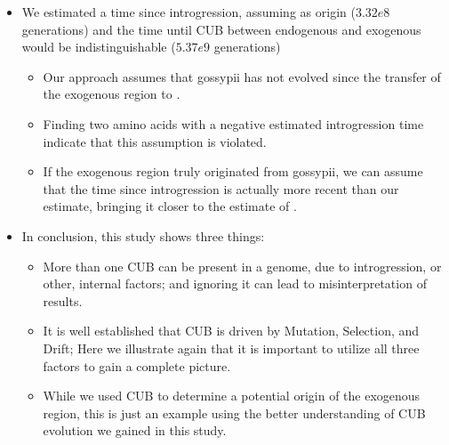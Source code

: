 \documentclass[12pt]{article}
\begin{document}
\begin{itemize}
	\item We estimated a time since introgression, assuming \gossypii as origin ($3.32e8$ generations) and the time until CUB between endogenous and exogenous would be indistinguishable ($5.37e9$ generations)
	\begin{itemize}
		\item Our approach assumes that gossypii has not evolved since the transfer of the exogenous region to \kluyveri.
		\item Finding two amino acids with a negative estimated introgression time indicate that this assumption is violated.
		\item If the exogenous region truly originated from gossypii, we can assume that the time since introgression is actually more recent than our estimate, bringing it closer to the estimate of \citep{friedrich2015}.
	\end{itemize}	
	\item In conclusion, this study shows three things:
	\begin{itemize}
		\item More than one CUB can be present in a genome, due to introgression, or other, internal factors; and ignoring it can lead to misinterpretation of results.
		\item It is well established that CUB is driven by Mutation, Selection, and Drift; Here we illustrate again that it is important to utilize all three factors to gain a complete picture.
		\item While we used CUB to determine a potential origin of the exogenous region, this is just an example using the better understanding of CUB evolution we gained in this study.
	\end{itemize}
\end{itemize}
\end{document}
